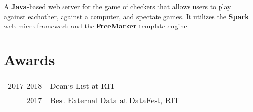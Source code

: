 \documentclass[]{deedy-resume-openfont}
\begin{document}
\begin{minipage}[t]{0.67\textwidth}
\location{}
A \textbf{Java}-based web server for the game of checkers that allows users to play against eachother, against a computer, and spectate games. It utilizes the \textbf{Spark} web micro framework and the \textbf{FreeMarker} template engine.
\sectionsep



%
%


\section{Awards}
\begin{tabular}{rll}
2017-2018	   & Dean's List at RIT \\
2017	   & Best External Data at DataFest, RIT \\
\end{tabular}
\sectionsep

\sectionsep

\end{minipage}
\end{document}

